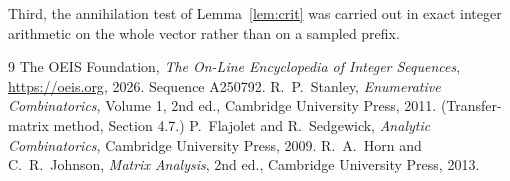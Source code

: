 \documentclass[11pt,a4paper]{article}
\theoremstyle{plain}
\theoremstyle{definition}
\begin{document}
Third, the annihilation test of Lemma~\ref{lem:crit} was carried out in exact integer
arithmetic on the whole vector rather than on a sampled prefix.

\begin{thebibliography}{9}
 The OEIS Foundation, \emph{The On-Line Encyclopedia of Integer
Sequences}, \url{https://oeis.org}, 2026. Sequence A250792.
 R.~P.~Stanley, \emph{Enumerative Combinatorics}, Volume 1, 2nd ed.,
Cambridge University Press, 2011. (Transfer-matrix method, Section 4.7.)
 P.~Flajolet and R.~Sedgewick, \emph{Analytic Combinatorics}, Cambridge
University Press, 2009.
 R.~A.~Horn and C.~R.~Johnson, \emph{Matrix Analysis}, 2nd ed., Cambridge
University Press, 2013.
\end{thebibliography}
\end{document}
